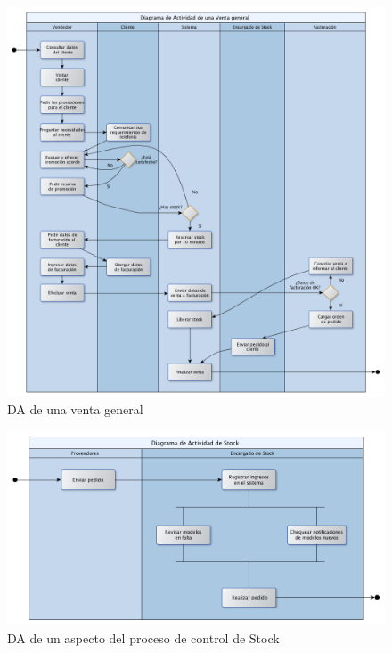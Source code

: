 \begin{figure}[h!]
  \centering
  \includegraphics[width=1\textwidth]{./imagenes/da_general.png}
  \caption{DA de una venta general}
  \label{fig:da_ventaGral}
\end{figure}

\clearpage

\begin{figure}[h!]
  \centering
  \includegraphics[width=1\textwidth]{./imagenes/da_stock.png}
  \caption{DA de un aspecto del proceso de control de Stock}
  \label{fig:da_stock}
\end{figure}


